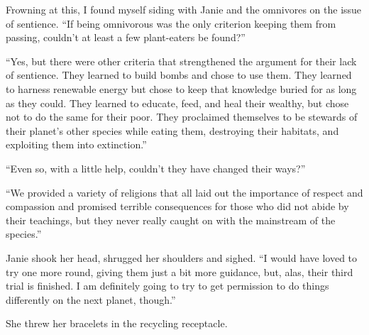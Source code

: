 Frowning at this, I found myself siding with Janie and the omnivores on
the issue of sentience. ``If being omnivorous was the only criterion
keeping them from passing, couldn't at least a few plant-eaters be
found?''

``Yes, but there were other criteria that strengthened the argument for
their lack of sentience. They learned to build bombs and chose to use
them. They learned to harness renewable energy but chose to keep that
knowledge buried for as long as they could. They learned to educate,
feed, and heal their wealthy, but chose not to do the same for their
poor. They proclaimed themselves to be stewards of their planet's other
species while eating them, destroying their habitats, and exploiting
them into extinction.''

``Even so, with a little help, couldn't they have changed their ways?''

``We provided a variety of religions that all laid out the importance of
respect and compassion and promised terrible consequences for those who
did not abide by their teachings, but they never really caught on with
the mainstream of the species.''

Janie shook her head, shrugged her shoulders and sighed. ``I would have
loved to try one more round, giving them just a bit more guidance, but,
alas, their third trial is finished. I am definitely going to try to get
permission to do things differently on the next planet, though.''

She threw her bracelets in the recycling receptacle.
